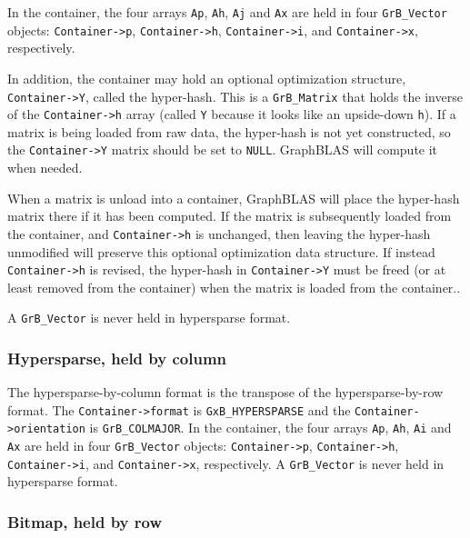 In the container, the four arrays \verb'Ap', \verb'Ah', \verb'Aj' and \verb'Ax'
are held in four \verb'GrB_Vector' objects:
\verb'Container->p',
\verb'Container->h',
\verb'Container->i', and \newline
\verb'Container->x', respectively.

In addition, the container may hold an optional optimization structure,
\verb'Container->Y', called the hyper-hash.  This is a \verb'GrB_Matrix' that
holds the inverse of the \verb'Container->h' array (called \verb'Y' because it
looks like an upside-down \verb'h').  If a matrix is being loaded from raw
data, the hyper-hash is not yet constructed, so the \verb'Container->Y' matrix
should be set to \verb'NULL'.  GraphBLAS will compute it when needed.

When a matrix is unload into a container, GraphBLAS will place the hyper-hash
matrix there if it has been computed.  If the matrix is subsequently loaded
from the container, and \verb'Container->h' is unchanged, then leaving the
hyper-hash unmodified will preserve this optional optimization data structure.
If instead \verb'Container->h' is revised, the hyper-hash in
\verb'Container->Y' must be freed (or at least removed from the container) when
the matrix is loaded from the container..

A \verb'GrB_Vector' is never held in hypersparse format.

\subsubsection{Hypersparse, held by column}
\label{format_hypersparse_by_col}

The hypersparse-by-column format is the transpose of the hypersparse-by-row format.
The \verb'Container->format' is \verb'GxB_HYPERSPARSE' and the \newline
\verb'Container->orientation' is \verb'GrB_COLMAJOR'.
In the container, the four arrays \verb'Ap', \verb'Ah', \verb'Ai' and \verb'Ax'
are held in four \verb'GrB_Vector' objects:
\verb'Container->p',
\verb'Container->h',
\verb'Container->i', and
\verb'Container->x', respectively.
A \verb'GrB_Vector' is never held in hypersparse format.

\subsubsection{Bitmap, held by row}
\label{format_bitmap_by_row}

